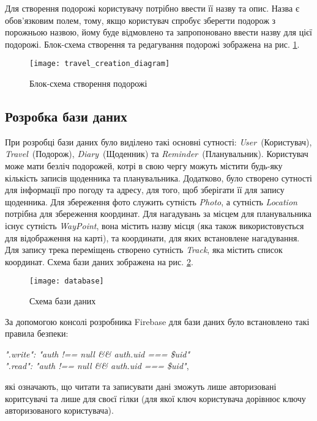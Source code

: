 \documentclass[../main.tex]{subfiles}
\begin{document}
Для створення подорожі користувачу потрібно ввести її назву та опис. Назва є обов'язковим полем, тому, якщо користувач спробує зберегти подорож з порожньою назвою, йому буде відмовлено та запропоновано ввести назву для цієї подорожі. Блок-схема створення та редагування подорожі зображена на рис. \ref{diagram:travel_creation}.

\begin{figure}[H]
	\centering
	\texttt{[image: travel\_creation\_diagram]}
	\caption{Блок-схема створення подорожі}
	\label{diagram:travel_creation}
\end{figure}

\subsection{Розробка бази даних}
При розробці бази даних було виділено такі основні сутності: \textit{User}~(Користувач), \textit{Travel}~(Подорож), \textit{Diary}~(Щоденник) та \textit{Reminder}~(Планувальник). Користувач може мати безліч подорожей, котрі в свою чергу можуть містити будь-яку кількість записів щоденника та планувальника. Додатково, було створено сутності для інформації про погоду та адресу, для того, щоб зберігати її для запису щоденника. Для збереження фото служить сутність \textit{Photo}, а сутність \textit{Location} потрібна для збереження координат. Для нагадувань за місцем для планувальника існує сутність \textit{WayPoint}, вона містить назву місця (яка також використовується для відображення на карті), та  координати, для яких встановлене нагадування. Для запису трека переміщень створено сутність \textit{Track}, яка містить список координат. Схема бази даних зображена на рис. \ref{diagram:database}.

\begin{figure}[H]
	\centering
	\texttt{[image: database]}
	\caption{Схема бази даних}
	\label{diagram:database}
\end{figure}

За допомогою консолі розробника Firebase для бази даних було встановлено такі правила безпеки:
\begin{center}
	\textit{".write": "auth !== null \&\& auth.uid === \$uid"}\\
	\textit{".read": "auth !== null \&\& auth.uid === \$uid"},
\end{center}
які означають, що читати та записувати дані зможуть лише авторизовані коритсувачі та лише для своєї гілки (для якої ключ користувача дорівнює ключу авторизованого користувача).
\end{document}
